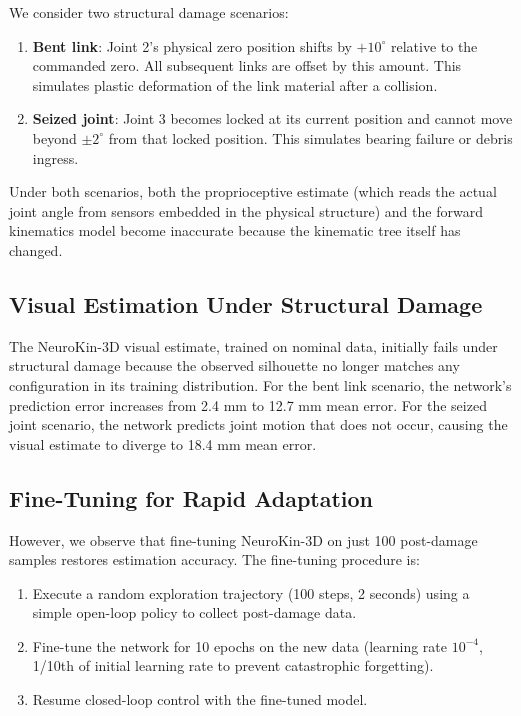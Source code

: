 ﻿\documentclass[12pt,a4paper,oneside]{report}
\begin{document}
We consider two structural damage scenarios:

\begin{enumerate}
    \item \textbf{Bent link}: Joint 2's physical zero position shifts by $+10^\circ$ relative to the commanded zero. All subsequent links are offset by this amount. This simulates plastic deformation of the link material after a collision.
    \item \textbf{Seized joint}: Joint 3 becomes locked at its current position and cannot move beyond $\pm2^\circ$ from that locked position. This simulates bearing failure or debris ingress.
\end{enumerate}

Under both scenarios, both the proprioceptive estimate (which reads the actual joint angle from sensors embedded in the physical structure) and the forward kinematics model become inaccurate because the kinematic tree itself has changed.

\subsection{Visual Estimation Under Structural Damage}

The NeuroKin-3D visual estimate, trained on nominal data, initially fails under structural damage because the observed silhouette no longer matches any configuration in its training distribution. For the bent link scenario, the network's prediction error increases from 2.4 mm to 12.7 mm mean error. For the seized joint scenario, the network predicts joint motion that does not occur, causing the visual estimate to diverge to 18.4 mm mean error.

\subsection{Fine-Tuning for Rapid Adaptation}

However, we observe that fine-tuning NeuroKin-3D on just 100 post-damage samples restores estimation accuracy. The fine-tuning procedure is:

\begin{enumerate}
    \item Execute a random exploration trajectory (100 steps, 2 seconds) using a simple open-loop policy to collect post-damage data.
    \item Fine-tune the network for 10 epochs on the new data (learning rate $10^{-4}$, 1/10th of initial learning rate to prevent catastrophic forgetting).
    \item Resume closed-loop control with the fine-tuned model.
\end{enumerate}
\end{document}

